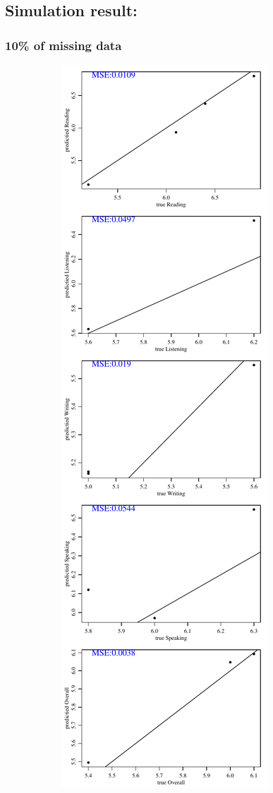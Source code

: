 \documentclass[12pt]{article}
\begin{document}
\subsection{Simulation result:}
\label{sim-result}
\newpage
\subsubsection{10\% of missing data}
\begin{figure}[h!]
\centering
\begin{subfigure}{0.4\textwidth}
    \includegraphics[height=.85\textheight]{pic/0.10/EM_PredvsTrue.pdf}

\end{subfigure}
\end{figure}
\end{document}
